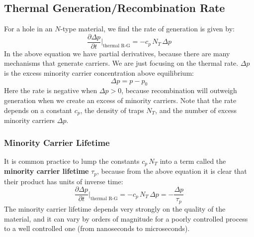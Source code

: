 \subsection{Thermal Generation/Recombination Rate}
For a hole in an $N$-type material, we find the rate of generation is given by:
    \begin{equation}
        \frac{\partial \Delta p}{\partial t} \bigg\rvert_{\text{thermal R-G}} = -c_p\,N_T\,\Delta p
    \end{equation}
In the above equation we have partial derivatives, because there are many mechanisms that generate carriers.  We are just focusing on the thermal rate.  $\Delta p$ is the excess minority carrier concentration above equilibrium:
    \begin{equation}
        \Delta p = p - p_0
    \end{equation}
Here the rate is negative when $\Delta p > 0$, because recombination will outweigh generation when we create an excess of minority carriers.  Note that the rate depends on a constant $c_p$, the density of traps $N_T$, and the number of excess minority carriers $\Delta p$.  
\subsubsection*{Minority Carrier Lifetime}
It is common practice to lump the constants $c_p\,N_T$ into a term called the \textbf{minority carrier lifetime} $\tau_p$, because from the above equation it is clear that their product has units of inverse time:
    \begin{equation}
        \frac{\partial \Delta p}{\partial t} \bigg\rvert_{\text{thermal R-G}} = - c_p\,N_T\,\Delta p = -\frac{\Delta p}{\tau_p}
        \label{eq:lifetime}
    \end{equation} 
The minority carrier lifetime depends very strongly on the quality of the material, and it can vary by orders of magnitude for a poorly controlled process to a well controlled one (from nanoseconds to microseconds).
